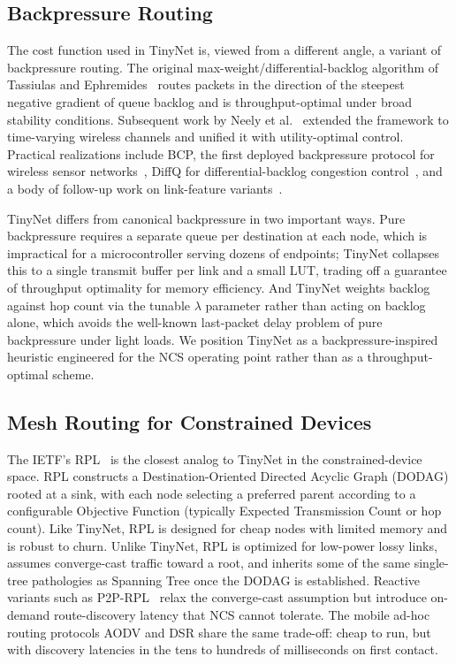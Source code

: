 \subsection{Backpressure Routing}
\label{sec:related:backpressure}
 
The cost function used in TinyNet is, viewed from a different angle, a variant of backpressure routing. The original max-weight/differential-backlog algorithm of Tassiulas and Ephremides~\cite{tassiulas1992} routes packets in the direction of the steepest negative gradient of queue backlog and is throughput-optimal under broad stability conditions. Subsequent work by Neely et al.~\cite{neely2005power,neely_book} extended the framework to time-varying wireless channels and unified it with utility-optimal control. Practical realizations include BCP, the first deployed backpressure protocol for wireless sensor networks~\cite{bcp}, DiffQ for differential-backlog congestion control~\cite{diffq}, and a body of follow-up work on link-feature variants~\cite{bp_link_features}.
 
TinyNet differs from canonical backpressure in two important ways. Pure backpressure requires a separate queue per destination at each node, which is impractical for a microcontroller serving dozens of endpoints; TinyNet collapses this to a single transmit buffer per link and a small LUT, trading off a guarantee of throughput optimality for memory efficiency. And TinyNet weights backlog against hop count via the tunable $\lambda$ parameter rather than acting on backlog alone, which avoids the well-known last-packet delay problem of pure backpressure under light loads. We position TinyNet as a backpressure-inspired heuristic engineered for the NCS operating point rather than as a throughput-optimal scheme.
 
\subsection{Mesh Routing for Constrained Devices}
\label{sec:related:mesh}
 
The IETF's RPL~\cite{rfc6550} is the closest analog to TinyNet in the constrained-device space. RPL constructs a Destination-Oriented Directed Acyclic Graph (DODAG) rooted at a sink, with each node selecting a preferred parent according to a configurable Objective Function (typically Expected Transmission Count or hop count). Like TinyNet, RPL is designed for cheap nodes with limited memory and is robust to churn. Unlike TinyNet, RPL is optimized for low-power lossy links, assumes converge-cast traffic toward a root, and inherits some of the same single-tree pathologies as Spanning Tree once the DODAG is established. Reactive variants such as P2P-RPL~\cite{rfc6997} relax the converge-cast assumption but introduce on-demand route-discovery latency that NCS cannot tolerate. The mobile ad-hoc routing protocols AODV and DSR share the same trade-off: cheap to run, but with discovery latencies in the tens to hundreds of milliseconds on first contact.
 
